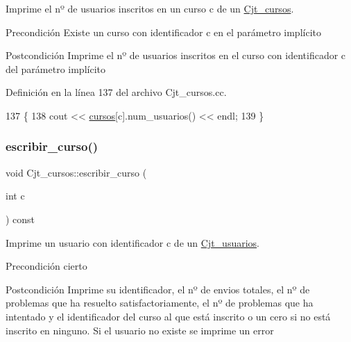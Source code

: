 Imprime el nº de usuarios inscritos en un curso c de un \mbox{\hyperlink{class_cjt__cursos}{Cjt\+\_\+cursos}}. 

\begin{DoxyPrecond}{Precondición}
Existe un curso con identificador c en el parámetro implícito 
\end{DoxyPrecond}
\begin{DoxyPostcond}{Postcondición}
Imprime el nº de usuarios inscritos en el curso con identificador c del parámetro implícito 
\end{DoxyPostcond}


Definición en la línea 137 del archivo Cjt\+\_\+cursos.\+cc.


\begin{DoxyCode}
137                                                       \{
138       cout << \mbox{\hyperlink{class_cjt__cursos_a582f9540bc295212450dba4cd18c8886}{cursos}}[c].num\_usuarios() << endl;
139     \}
\end{DoxyCode}
\mbox{\label{class_cjt__cursos_a6c98d2f0a31253b84dc8b4a0ea48c348}} 
\subsubsection{\texorpdfstring{escribir\+\_\+curso()}{escribir\_curso()}}
{\footnotesize\ttfamily void Cjt\+\_\+cursos\+::escribir\+\_\+curso (\begin{DoxyParamCaption}\item[{int}]{c }\end{DoxyParamCaption}) const}



Imprime un usuario con identificador c de un \mbox{\hyperlink{class_cjt__usuarios}{Cjt\+\_\+usuarios}}. 

\begin{DoxyPrecond}{Precondición}
cierto 
\end{DoxyPrecond}
\begin{DoxyPostcond}{Postcondición}
Imprime su identificador, el nº de envios totales, el nº de problemas que ha resuelto satisfactoriamente, el nº de problemas que ha intentado y el identificador del curso al que está inscrito o un cero si no está inscrito en ninguno. Si el usuario no existe se imprime un error 
\end{DoxyPostcond}


